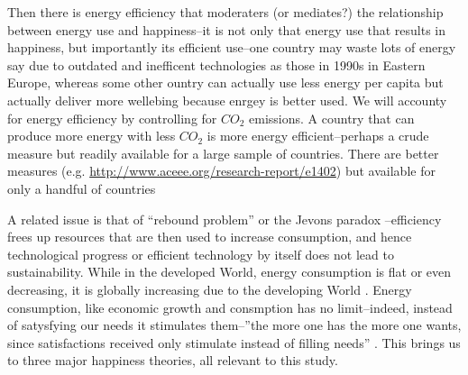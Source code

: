 \documentclass[10pt, letterpaper]{article}
\begin{document}
\begin{spacing}{1.4}
Then there is energy efficiency that moderaters (or mediates?) the relationship
between energy use and happiness--it is not only that energy use that results in
happiness, but importantly its efficient use--one country may waste lots of
energy say due to outdated and inefficent technologies as those in 1990s in
Eastern Europe, whereas some other ountry can actually use less energy per
capita but actually deliver more wellebing because enrgey is better used. We
will accounty for  energy efficiency by controlling for  $CO_2$ emissions. 
 A country that can produce more energy with less $CO_2$ is more energy
 efficient--perhaps a crude measure but readily available for a large sample of
 countries. There are better measures (e.g. \url{http://www.aceee.org/research-report/e1402}) but available for only a handful of countries

A related issue is that of ``rebound problem'' or the Jevons paradox
\cite{pretty13}%
--efficiency frees up resources that are then used to increase consumption, and
hence technological progress or efficient technology by itself does not lead to
sustainability. While in the developed World, energy consumption is flat or even
decreasing, it is globally increasing due to the developing World
\cite{pretty13}. Energy consumption, like economic growth and consmption has no
limit--indeed, instead of satysfying our needs it stimulates them--''the more
one has the more one wants, since satisfactions received only stimulate instead
of filling needs''   \cite{durkheim50}. This brings us to three major happiness
theories, all relevant to this study. 





\end{spacing}
\end{document}
